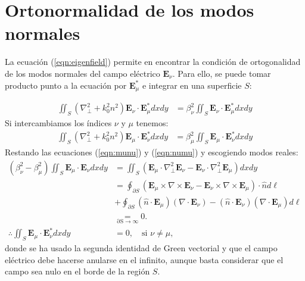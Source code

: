 \chapter{Ortonormalidad de los modos normales \label{sec:orto}}

La ecuación (\ref{eqn:eigenfield}) permite en encontrar la condición de ortogonalidad de los modos normales del campo eléctrico  $\textbf{E}_\nu$. Para ello, se puede tomar producto punto a la ecuación por $\textbf{E}_\mu^*$ e integrar en una superficie $S$:

\begin{align}
	 \iint_S \left(  \nabla_\perp^2  + k_0^2n^2 \right)\textbf{E}_\nu \cdot\textbf{E}_\mu^* dxdy &= \beta_\nu^2 \iint_S \textbf{E}_\nu \cdot\textbf{E}_\mu^* dxdy \label{eqn:munu}
\end{align}
Si intercambiamos los índices $\nu$ y $\mu$ tenemos:
\begin{align}
	 	\iint_S \left(  \nabla_\perp^2  + k_0^2n^2 \right)\textbf{E}_\mu \cdot\textbf{E}_\nu^* dxdy &= \beta_\mu^2 \iint_S \textbf{E}_\mu \cdot\textbf{E}_\nu^* dxdy \label{eqn:numu}
\end{align}
Restando las ecuaciones (\ref{eqn:munu}) y (\ref{eqn:numu}) y escogiendo modos reales:
\begin{align*}
	 	  (\beta_\nu^2-\beta_\mu^2)\iint_S\textbf{E}_\mu \cdot\textbf{E}_\nu dxdy &=  \iint_S \left(\textbf{E}_\mu   \cdot\nabla_\perp^2 \textbf{E}_\nu - \textbf{E}_\nu   \cdot\nabla_\perp^2 \textbf{E}_\mu\right)  dxdy
		\nonumber	 	  
	 	  \\
	 	  &=
	 	  \oint_{\partial S} (\textbf{E}_\mu \times \nabla \times \textbf{E}_\nu - \textbf{E}_\nu \times \nabla \times \textbf{E}_\mu) \cdot \hat{n}d\ell
	 	  \nonumber
			\\	 	  
	 	  &+
	 	  \oint_{\partial S} (\hat{n}\cdot \textbf{E}_\mu)(\nabla\cdot \textbf{E}_\nu) - (\hat{n}\cdot \textbf{E}_\nu)(\nabla\cdot \textbf{E}_\mu) d\ell
	 	  \nonumber
	 	  \\
	 	  &\underset{\mathrm{\partial S \to \infty}}{=}  0.
	 	 \\
	 	 \therefore \iint_S\textbf{E}_\mu \cdot\textbf{E}_\nu^* dxdy &= 0, \quad \text{si } \nu\neq\mu,
\end{align*}
donde se ha usado la segunda identidad de Green vectorial \citep{greenvectorial} y que el campo eléctrico debe hacerse anularse en el infinito, aunque basta considerar que el campo sea nulo en el borde de la región $S$.